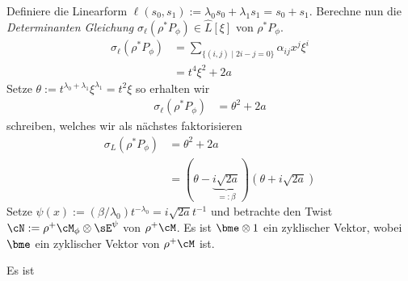 Definiere die Linearform $\ell(s_0,s_1):=\lambda_0s_0+\lambda_1s_1=s_0+s_1$.
Berechne nun die \emph{Determinanten Gleichung}
$\sigma_\ell(\rho^*P_{\phi})\in \hat L[\xi]$ von $\rho^*P_{\phi}$.
\begin{align*}
\sigma_\ell(\rho^*P_{\phi})
  &= \sum_{\{(i,j)\mid 2i-j=0\}}\alpha_{ij}x^{j}\xi^i\\
  &= t^4\xi^2 + 2a
\end{align*}
Setze $\theta:=t^{\lambda_0+\lambda_1}\xi^{\lambda_1}=t^2\xi$ so erhalten wir
\begin{align*}
\sigma_\ell(\rho^*P_{\phi}) &= \theta^2 + 2a
\end{align*}
schreiben, welches wir als nächstes faktorisieren
\begin{align*}
\sigma_L(\rho^*P_{\phi}) &= \theta^2+2a\\
  &=(\theta-\underset{=:\beta}{\underbrace{i\sqrt{2a}}})
    (\theta+i\sqrt{2a})
\end{align*}
Setze $\psi(x):=(\beta/\lambda_0)t^{-\lambda_0}=i\sqrt{2a}t^{-1}$ und
betrachte den Twist $\cN:=\rho^+\cM_{\phi}\otimes\sE^\psi$ von
$\rho^+\cM$.
Es ist $\bme\otimes 1$ ein zyklischer Vektor, wobei $\bme$ ein zyklischer
Vektor von $\rho^+\cM$ ist.
\iffalse
  Somit existieren $a_0(t)$ und $a_1(t)$ in $\hat L$, so dass
  \[
  0=\partial_t^2 (\bme\otimes 1) + (a_1(t)\partial_t + a_0(t)) \bme\otimes 1
  \]
  und damit ist dann $\cN=\cD/\cD\cdot(\partial_t^2+a_1(t)\partial_t+a_0(t))$.
\fi
Es ist

